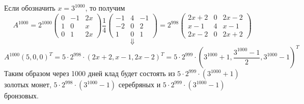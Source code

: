 \documentclass{article}
\begin{document}
Если обозначить $x=3^{1000}$, то получим
$$A^{1000}=2^{1000}\left(\begin{array}{rrr}0 & -1 & 2x\\1 & 0 & x\\0 & 1 & 2x\end{array}\right)\frac{1}{4}\left(\begin{array}{rrr}-1 & 4 & -1\\-2 & 0 & 2\\1 & 0 & 1\end{array}\right)=2^{998}\left(\begin{array}{rrr}2x+2 & 0 & 2x-2\\x-1 & 4 & x-1\\2x-2 & 0 & 2x+2\end{array}\right)$$
$$\Downarrow$$
$$A^{1000}(5,0,0)^T=5\cdot2^{998}\cdot(2x+2, x-1, 2x-2)^T = 5\cdot2^{999}\cdot(3^{1000}+1, \frac{3^{1000}-1}{2}, 3^{1000}-1)^T$$
Таким образом через 1000 дней клад будет состоять из $5\cdot2^{999}\cdot(3^{1000}+1)$ золотых монет, $5\cdot2^{998}\cdot(3^{1000}-1)$ серебряных и  $5\cdot2^{999}\cdot(3^{1000}-1)$ бронзовых.
\end{document}
